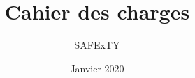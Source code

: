 \documentclass[16pt]{article}
\title{\Huge Cahier des charges}
\author{SAFExTY}
\date{Janvier 2020}
\begin{document}
\maketitle
\pagebreak

\tableofcontents







\end{document}
